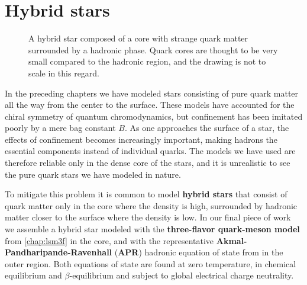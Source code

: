 \chapter{Hybrid stars}

\begin{figure}[th!]
\centering
{}
\caption{\label{fig:hybrid:illustration}%
	A hybrid star composed of a core with strange quark matter surrounded by a hadronic phase.
	Quark cores are thought to be very small compared to the hadronic region, and the drawing is not to scale in this regard.
}
\end{figure}

In the preceding chapters we have modeled stars consisting of pure quark matter all the way from the center to the surface.
These models have accounted for the chiral symmetry of quantum chromodynamics,
but confinement has been imitated poorly by a mere bag constant $B$.
As one approaches the surface of a star,
the effects of confinement becomes increasingly important,
making hadrons the essential components instead of individual quarks.
The models we have used are therefore reliable only in the dense core of the stars,
and it is unrealistic to see the pure quark stars we have modeled in nature.

To mitigate this problem it is common to model \textbf{hybrid stars} that consist of
quark matter only in the core where the density is high, 
surrounded by hadronic matter closer to the surface where the density is low.
In our final piece of work
we assemble a hybrid star modeled with the \textbf{three-flavor quark-meson model} from \cref{chap:lsm3f} in the core,
and with the representative \textbf{Akmal-Pandharipande-Ravenhall} (\textbf{APR}) hadronic equation of state from \cite{ref:apr} in the outer region.
Both equations of state are found at zero temperature, in chemical equilibrium and $\beta$-equilibrium and subject to global electrical charge neutrality.

